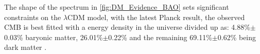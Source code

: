 \par
The shape of the spectrum in \autoref{fig:DM_Evidence_BAO} sets significant constraints on the $\lambda$CDM model, with the latest Planck result, the observed CMB is best fitted with a energy density in the universe divided up as: 4.88\%$\pm$0.03\% baryonic matter, 26.01\%$\pm$0.22\% and the remaining 69.11\%$\pm$0.62\% being dark matter \cite{plank_result_ref}.